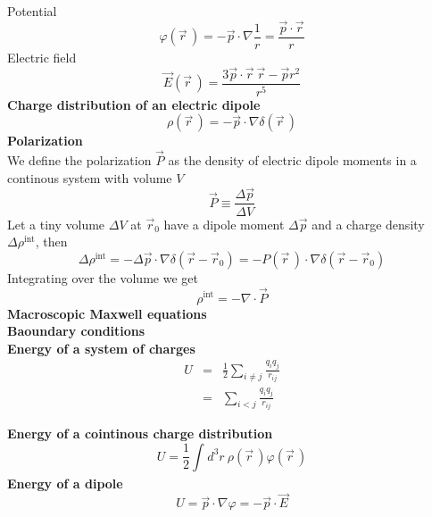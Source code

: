 \documentclass[12pt,a4paper]{article}
\newcommand{\diver}[1]{\nabla \cdot} %
\newcommand{\integral}[3]{\int_{#1}^{#2} d #3 \ } %
\begin{document}
Potential
\begin{equation}
	\varphi(\vec{r}\,) = -\vec{p}\cdot \nabla\frac{1}{r} = \frac{\vec{p}\cdot \vec{r}}{r}
\end{equation}
Electric field
\begin{equation}
	\vec{E}(\vec{r}\,) =  \frac{3\vec{p}\cdot \vec{r} \ \vec{r}-\vec{p}r^2}{r^5}
\end{equation}
\textbf{Charge distribution of an electric dipole}\\
\begin{equation}
	\rho(\vec{r}\,) = -\vec{p} \cdot \nabla \delta (\vec{r}\,)
\end{equation}
\textbf{Polarization}\\
We define the polarization $\vec{P}$ as the density of electric dipole moments in a continous system with volume $V$
\begin{equation}
	\vec{P} \equiv \frac{\Delta \vec{p}}{\Delta V} 
\end{equation}
Let a tiny volume $\Delta V$ at $\vec{r}_0$ have a dipole moment $\Delta \vec{p}$ and a charge density $\Delta \rho^{\text{int}}$, then
\begin{equation}
	\Delta \rho^{\text{int}} = -\Delta \vec{p}  \cdot \nabla \delta (\vec{r} -\vec{r}_0) = - P(\vec{r}\,) \cdot \nabla \delta (\vec{r} -\vec{r}_0) 
\end{equation}
Integrating over the volume we get
\begin{equation}
 \rho^{\text{int}} = -\diver{} \vec{P}
\end{equation}
\textbf{Macroscopic Maxwell equations}\\

\textbf{Baoundary conditions}\\

\textbf{Energy of a system of charges}\\
	\begin{eqnarray}
		U & = & \frac{1}{2}\sum_{i\neq j} \frac{q_iq_j}{r_{ij}} \\
		& = & \sum_{i<j}\frac{q_iq_j}{r_{ij}}
	\end{eqnarray}

\textbf{Energy of a cointinous charge distribution}\\
\begin{equation}
	U = \frac{1}{2} \integral{}{}{^3r}\rho(\vec{r}\,) \varphi (\vec{r}\,)
\end{equation}
\textbf{Energy of a dipole}\\
\begin{equation}
	U = \vec{p} \cdot \nabla \varphi = -\vec{p} \cdot \vec{E}
\end{equation}
\end{document}
